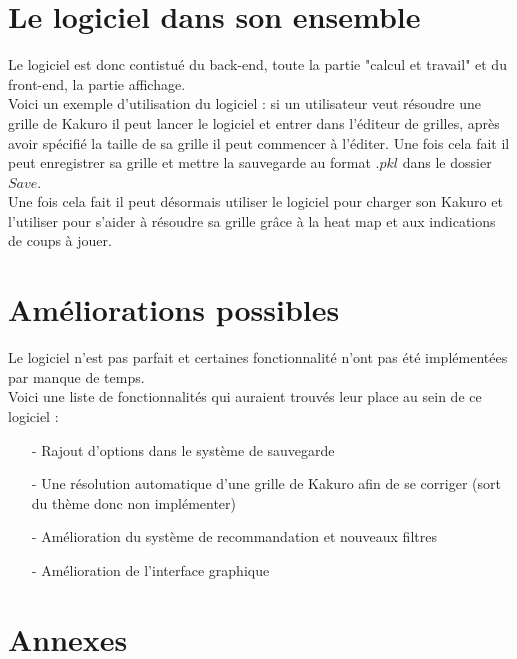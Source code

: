 \documentclass[french,12pt]{article}
\begin{document}
\section{Le logiciel dans son ensemble}

Le logiciel est donc contistué du back-end, toute la partie "calcul et travail" et du front-end, la partie affichage. \\
Voici un exemple d'utilisation du logiciel : si un utilisateur veut résoudre une grille de Kakuro il peut lancer le logiciel et entrer dans l'éditeur de grilles, après avoir spécifié la taille de sa grille il peut commencer à l'éditer. Une fois cela fait il peut enregistrer sa grille et mettre la sauvegarde au format $.pkl$ dans le dossier $Save$. \\ Une fois cela fait il peut désormais utiliser le logiciel pour charger son Kakuro et l'utiliser pour s'aider à résoudre sa grille grâce à la heat map et aux indications de coups à jouer. 

\section{Améliorations possibles}

Le logiciel n'est pas parfait et certaines fonctionnalité n'ont pas été implémentées par manque de temps. \\
Voici une liste de fonctionnalités qui auraient trouvés leur place au sein de ce logiciel : \\

\begin{enumerate}
	\item[-] Rajout d'options dans le système de sauvegarde
	\item[-] Une résolution automatique d'une grille de Kakuro afin de se corriger (sort du thème donc non implémenter)
	\item[-] Amélioration du système de recommandation et nouveaux filtres
	\item[-] Amélioration de l'interface graphique
\end{enumerate}

\newpage
\section{Annexes}

\begin{figure}
	
\end{figure}
\end{document}
